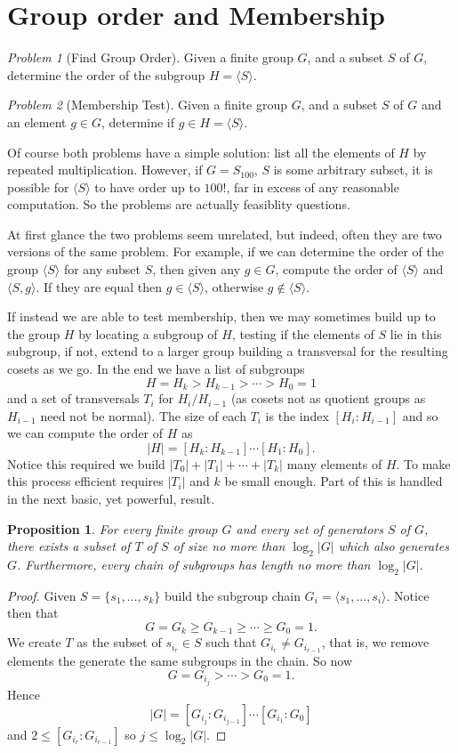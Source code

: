 \documentclass[12pt]{article}
\newtheorem{prop}[thm]{Proposition}
\begin{document}
\section{Group order and Membership}

\emph{Problem 1} (Find Group Order).  Given a finite group $G$, and a subset $S$ of $G$, determine
the order of the subgroup $H=\langle S\rangle$.

\emph{Problem 2} (Membership Test).  Given a finite group $G$, and a subset $S$ of $G$ and an element $g\in G$, determine if $g\in H=\langle S\rangle$.

Of course both problems have a simple solution: list all the elements of $H$ by repeated multiplication.  However, if $G=S_{100}$, $S$ is some arbitrary subset, it is possible for $\langle S\rangle$ to have order up to $100!$, far in excess of any reasonable computation.  So the problems are actually feasiblity questions.

At first glance the two problems seem unrelated, but indeed, often they are two versions of the same problem.  For example, if we can determine the order of the group $\langle S \rangle$ for any subset $S$, then given any $g\in G$, compute the order of $\langle S\rangle$ and $\langle S,g\rangle$.  If they are equal then $g\in \langle S\rangle$, otherwise $g\notin \langle S\rangle$.

If instead we are able to test membership, then we may sometimes build up to the group $H$ by locating a subgroup of $H$, testing if the elements of $S$ lie in this subgroup, if not, extend to a larger group building a transversal for the resulting cosets as we go.  In the end we have a list of subgroups
 \[H=H_k>H_{k-1}>\cdots>H_0=1\]
and a set of transversals $T_i$ for $H_i/H_{i-1}$ (as cosets not as quotient groups as $H_{i-1}$ need not be normal).  The size of each $T_i$ is the index 
$[H_{i}:H_{i-1}]$ and so we can compute the order of $H$ as
 \[|H|=[H_k:H_{k-1}]\cdots [H_1:H_0].\]
Notice this required we build $|T_0|+|T_1|+\cdots+|T_k|$ many elements of $H$.
To make this process efficient requires $|T_i|$ and $k$ be small enough.  Part of this is handled in the next basic, yet powerful, result.

\begin{prop}
For every finite group $G$ and every set of generators $S$ of $G$, there
exists a subset of $T$ of $S$ of size no more than $\log_2 |G|$ which
also generates $G$.  Furthermore, every chain of subgroups has length no
more than $\log_2 |G|$.
\end{prop}
\begin{proof}
Given $S=\{s_1,\dots,s_k\}$ build the subgroup chain $G_i=\langle s_1,\dots,s_i\rangle$.  Notice then that
\[G=G_k\geq G_{k-1}\geq\cdots\geq G_0=1.\]
We create $T$ as the subset of $s_{i_r}\in S$ such that $G_{i_r}\neq G_{i_{r-1}}$, that is, we remove elements the generate the same subgroups in the chain.  So now
\[G=G_{i_j}>\cdots>G_0=1.\]
Hence
\[|G|=[G_{i_j}:G_{i_{j-1}}]\cdots [G_{i_1}:G_0]\]
and $2\leq [G_{i_{r}}:G_{i_{r-1}}]$ so $j\leq \log_2 |G|$.
\end{proof}
\end{document}
